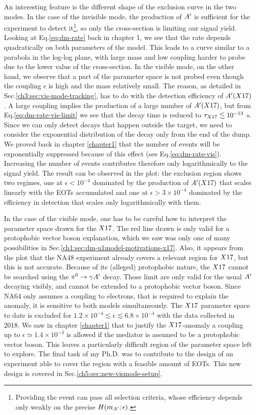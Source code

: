 An interesting feature is the different shape of the exclusion curve in the two modes. In the case of the invisible mode, the production of $A'$ is sufficient for the experiment to detect it\footnote{Providing the event can pass all selection criteria, whose efficiency depends only weakly on the precise $H(m_{A'};\epsilon)$.}, so only the cross-section is limiting our signal yield. Looking at Eq.\ref{eq:dm-rate} back in chapter 1, we see that the rate depends quadratically on both parameters of the model. This leads to a curve similar to a parabola in the log-log plane, with large mass and low coupling harder to probe due to the lower value of the cross-section. In the visible mode, on the other hand, we observe that a part of the parameter space is not probed even though the coupling $\epsilon$ is high and the mass relatively small. The reason, as detailed in Sec.\ref{ch3:sec:vis-mode-tracking}, has to do with the detection efficiency of $A'(X17)$. A large coupling implies the production of a large number of $A'(X17)$, but from Eq.\ref{eq:dm-rate-vis-limit} we see that the decay time is reduced to $\tau_{X17} \lesssim 10^{-13}$ $\si{\second}$. Since we can only detect decays that happen outside the target, we need to consider the exponential distribution of the decay only from the end of the dump. We proved back in chapter \ref{chapter1} that the number of events will be exponentially suppressed because of this effect (see Eq.\ref{eq:dm-rate-vis}). Increasing the number of events contributes therefore only logarithmically to the signal yield. The result can be observed in the plot: the exclusion region shows two regimes, one at $\epsilon < 10^{-4}$ dominated by the production of $A'(X17)$ that scales linearly with the EOTs accumulated and one at $\epsilon > 3 \times 10^{-4}$ dominated by the efficiency in detection that scales only logarithmically with them.

In the case of the visible mode, one has to be careful how to interpret the parameter space drawn for the $X17$. The red line drawn is only valid for a protophobic vector boson explanation, which we saw was only one of many possibilities in Sec.\ref{ch1:sec:dm-u1model-motivations-x17}. Also, it appears from the plot that the NA48 experiment already covers a relevant region for $X17$, but this is not accurate. Because of its (alleged) protophobic nature, the $X17$ cannot be searched using the $\pi^0 \rightarrow \gamma A'$ decay. Those limit are only valid for the usual $A'$ decaying visibly, and cannot be extended to a protophobic vector boson. Since NA64 only assumes a coupling to electrons, that is required to explain the anomaly, it is sensitive to both models simultaneously. The $X17$ parameter space to date is excluded for $1.2 \times 10^{-4} \lesssim \epsilon \lesssim 6.8 \times 10^{-4}$ with the data collected in 2018. We saw in chapter \ref{chapter1} that to justify the $X17$-anomaly a coupling up to $\epsilon \simeq 1.4 \times 10^{-3}$ is allowed if the mediator is assumed to be a protophobic vector boson. This leaves a particularly difficult region of the parameter space left to explore. The final task of my Ph.D. was to contribute to the design of an experiment able to cover the region with a feasible amount of EOTs. This new design is covered in Sec.\ref{ch5:sec:new-vismode-setup}.

